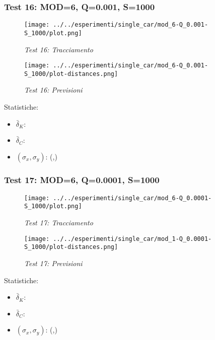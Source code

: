 \newpage
\subsubsection{Test 16: MOD=6, Q=0.001, S=1000}

\begin{figure}[hb]
\centering
\texttt{[image: ../../esperimenti/single\_car/mod\_6-Q\_0.001-S\_1000/plot.png]}
\caption{\textit{Test 16: Tracciamento}}
\end{figure}

\begin{figure}[hb]
\centering
\texttt{[image: ../../esperimenti/single\_car/mod\_6-Q\_0.001-S\_1000/plot-distances.png]}
\caption{\textit{Test 16: Previsioni}}
\end{figure}

Statistiche:
\begin{itemize}
\item \begin{math} \bar \delta_K:  \end{math}
\item \begin{math} \bar \delta_C:  \end{math}
\item \begin{math}(\sigma_x,\sigma_y)\end{math}: (,)
\end{itemize}

\newpage
\subsubsection{Test 17: MOD=6, Q=0.0001, S=1000}

\begin{figure}[hb]
\centering
\texttt{[image: ../../esperimenti/single\_car/mod\_6-Q\_0.0001-S\_1000/plot.png]}
\caption{\textit{Test 17: Tracciamento}}
\end{figure}

\begin{figure}[hb]
\centering
\texttt{[image: ../../esperimenti/single\_car/mod\_1-Q\_0.0001-S\_1000/plot-distances.png]}
\caption{\textit{Test 17: Previsioni}}
\end{figure}

Statistiche:
\begin{itemize}
\item \begin{math} \bar \delta_K:  \end{math}
\item \begin{math} \bar \delta_C:  \end{math}
\item \begin{math}(\sigma_x,\sigma_y)\end{math}: (,)
\end{itemize}

